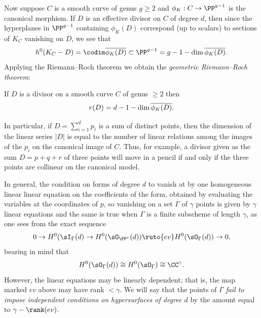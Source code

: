 Now suppose $C$ is a smooth curve of genus $g\geq 2$ and $\phi_K: C\to \PP^{g-1}$ is the canonical morphism.
If  $D$ is an effective divisor on $C$ of degree $d$, then since the hyperplanes in $\PP^{g-1}$ containing $\phi_K(D)$ correspond (up to scalars) to sections of $K_C$ vanishing on $D$, we see that
$$
h^0(K_C-D) = \codim \overline{ \phi_K(D)} \subset \PP^{g-1}= g - 1 - \dim \overline{ \phi_K(D)}.
$$
%
%
Applying the Riemann--Roch theorem we obtain  the \emph{geometric Riemann--Roch theorem}:

\begin{corollary}\label{geometric RR}
If $D$ is a divisor on a smooth curve $C$ of genus $\geq 2$ then
$$
r(D) = d - 1 - \dim \overline{ \phi_K(D)}.
\vspace*{-3pt}
$$
\end{corollary}
%
In particular, if $D = \sum_{i=1}^dp_i$ is a sum of distinct points, then
 the dimension of the linear series $|D|$  is equal to the number of linear relations among the images of the $p_i$ on the canonical 
 image of $C$. 
 Thus, for example, a divisor given as the sum $D = p+q+r$ of three
 points will move in a pencil if and only if the three points are
 collinear on the canonical model. 

In general, 
the condition on forms of degree $d$ to vanish at 
by one homogeneous linear
 linear equation on the coefficients of the form, obtained by evaluating the variables at 
 the coordinates of $p$, so vanishing on a set $\Gamma$ of $\gamma$ points is given by
 $\gamma$ linear equations and the same is true when $\Gamma$ is a finite subscheme
 of length $\gamma$, as one sees from the exact sequence
 $$
 0\to H^0(\sI_\Gamma(d) \to H^0(\sO_{\PP^r}(d)) \ruto{ev} H^0(\sO_{\Gamma}(d)) \to 0,
 $$
 bearing in mind that 
 $$
 H^0(\sO_{\Gamma}(d)) \cong H^0(\sO_{\Gamma}) \cong \CC^\gamma.
 $$
However, the linear equations may be linearly dependent; that is, the map marked $ev$
above may have rank $<\gamma$. We will say that the points of $\Gamma$
\emph{fail to impose independent conditions on hypersurfaces of degree $d$}
by the amount equal to $\gamma - \rank(ev)$. 

